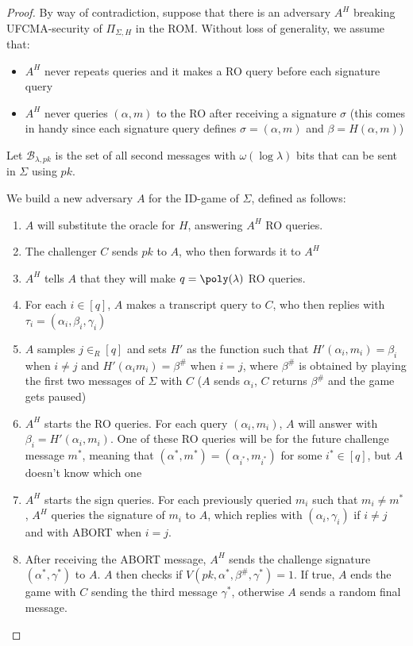 \documentclass[a4paper, 12pt]{report}
\begin{document}
    \begin{proof}
        By way of contradiction, suppose that there is an adversary $A^H$ breaking UFCMA-security of $\Pi_{\Sigma, H}$ in the ROM. Without loss of generality, we assume that:
        \begin{itemize}
            \item $A^H$ never repeats queries and it makes a RO query before each signature query
            \item $A^H$ never queries $(\alpha, m)$ to the RO after receiving a signature $\sigma$ (this comes in handy since each signature query defines $\sigma = (\alpha,m)$ and $\beta = H(\alpha, m)$)
        \end{itemize}

        Let $\mathcal{B}_{\lambda, pk}$ is the set of all second messages with $\omega(\log \lambda)$ bits that can be sent in $\Sigma$ using $pk$.

        We build a new adversary $A$ for the ID-game of $\Sigma$, defined as follows:
        \begin{enumerate}
            \item $A$ will substitute the oracle for $H$, answering $A^H$ RO queries.
            \item The challenger $C$ sends $pk$ to $A$, who then forwards it to $A^H$
            \item $A^H$ tells $A$ that they will make $q = \poly(\lambda)$ RO queries. 
            \item For each $i \in [q]$, $A$ makes a transcript query to $C$, who then replies with $\tau_i = (\alpha_i, \beta_i, \gamma_i)$
            \item $A$ samples $j \in_R [q]$ and sets $H'$ as the function such that $H'(\alpha_i, m_i) = \beta_i$ when $i \neq j$ and $H'(\alpha_i m_i) = \beta^{\#}$ when $i = j$, where $\beta^{\#}$ is obtained by playing the first two messages of $\Sigma$ with $C$ ($A$ sends $\alpha_i$, $C$ returns $\beta^{\#}$ and the game gets paused)
            \item $A^H$ starts the RO queries. For each query $(\alpha_i, m_i)$, $A$ will answer with $\beta_i = H'(\alpha_i, m_i)$. One of these RO queries will be for the future challenge message $m^*$, meaning that $(\alpha^*, m^*) = (\alpha_{i^*}, m_{i^*})$ for some $i^* \in [q]$, but $A$ doesn't know which one 
            \item $A^H$ starts the sign queries. For each previously queried $m_i$ such that $m_i \neq m^*$, $A^H$ queries the signature of $m_i$ to $A$, which replies with $(\alpha_i, \gamma_i)$ if $i \neq j$ and with ABORT when $i = j$.
            \item After receiving the ABORT message, $A^H$ sends the challenge signature $(\alpha^*, \gamma^*)$ to $A$. $A$ then checks if $V(pk, \alpha^*, \beta^{\#}, \gamma^*) = 1$. If true, $A$ ends the game with $C$ sending the third message $\gamma^*$, otherwise $A$ sends a random final message.
        \end{enumerate}


\end{proof}
\end{document}
